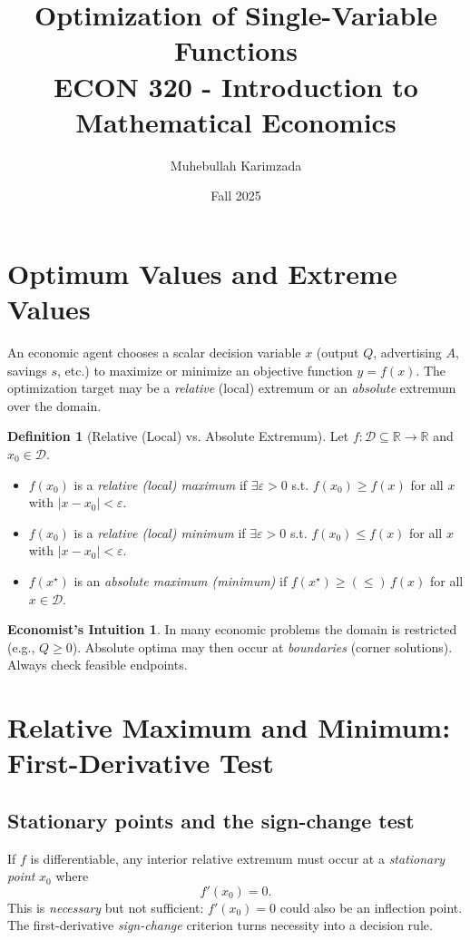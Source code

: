 \documentclass[12pt]{article}
\title{Optimization of Single-Variable Functions\\[10pts]
{\large ECON 320 - Introduction to Mathematical Economics}}
\author{Muhebullah Karimzada}
\date{Fall 2025}
\newcommand{\R}{\mathbb{R}}
\theoremstyle{definition}
\newtheorem{definition}{Definition}
\newtheorem{remark}{Economist's Intuition}
\begin{document}
\maketitle
\tableofcontents

\newpage

\section{Optimum Values and Extreme Values}

An economic agent chooses a scalar decision variable $x$ (output $Q$, advertising $A$, savings $s$, etc.) to maximize or minimize an objective function $y=f(x)$. The optimization target may be a \emph{relative} (local) extremum or an \emph{absolute} extremum over the domain.

\begin{definition}[Relative (Local) vs. Absolute Extremum]
Let $f:\mathcal{D}\subseteq\R\to\R$ and $x_0\in\mathcal{D}$. 
\begin{itemize}[leftmargin=1.5em]
\item $f(x_0)$ is a \emph{relative (local) maximum} if $\exists \varepsilon>0$ s.t. $f(x_0)\ge f(x)$ for all $x$ with $|x-x_0|<\varepsilon$.
\item $f(x_0)$ is a \emph{relative (local) minimum} if $\exists \varepsilon>0$ s.t. $f(x_0)\le f(x)$ for all $x$ with $|x-x_0|<\varepsilon$.
\item $f(x^\star)$ is an \emph{absolute maximum (minimum)} if $f(x^\star)\ge(\le)\, f(x)$ for all $x\in\mathcal{D}$.
\end{itemize}
\end{definition}

\begin{remark}
In many economic problems the domain is restricted (e.g., $Q\ge0$). Absolute optima may then occur at \emph{boundaries} (corner solutions). Always check feasible endpoints.
\end{remark}

\section{Relative Maximum and Minimum: First-Derivative Test}
\subsection*{Stationary points and the sign-change test}
If $f$ is differentiable, any interior relative extremum must occur at a \emph{stationary point} $x_0$ where
\[
f'(x_0)=0.
\]
This is \emph{necessary} but not sufficient: $f'(x_0)=0$ could also be an inflection point. The first-derivative \emph{sign-change} criterion turns necessity into a decision rule.
\end{document}
